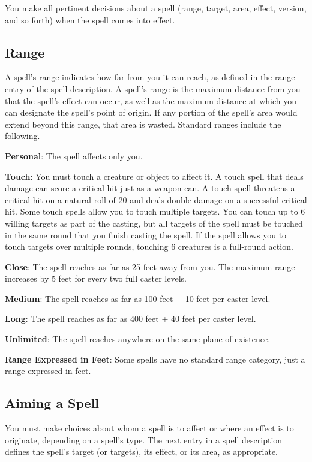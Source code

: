 You make all pertinent decisions about a spell (range, target, area, effect, version, and so forth) when the spell comes into effect.
				
\subsection{Range}

				
A spell's range indicates how far from you it can reach, as defined in the range entry of the spell description. A spell's range is the maximum distance from you that the spell's effect can occur, as well as the maximum distance at which you can designate the spell's point of origin. If any portion of the spell's area would extend beyond this range, that area is wasted. Standard ranges include the following.
				
\textbf{Personal}: The spell affects only you.
				
\textbf{Touch}: You must touch a creature or object to affect it. A touch spell that deals damage can score a critical hit just as a weapon can. A touch spell threatens a critical hit on a natural roll of 20 and deals double damage on a successful critical hit. Some touch spells allow you to touch multiple targets. You can touch up to 6 willing targets as part of the casting, but all targets of the spell must be touched in the same round that you finish casting the spell. If the spell allows you to touch targets over multiple rounds, touching 6 creatures is a full-round action.
				
\textbf{Close}: The spell reaches as far as 25 feet away from you. The maximum range increases by 5 feet for every two full caster levels.
				
\textbf{Medium}: The spell reaches as far as 100 feet + 10 feet per caster level.
				
\textbf{Long}: The spell reaches as far as 400 feet + 40 feet per caster level.
				
\textbf{Unlimited}: The spell reaches anywhere on the same plane of existence.
				
\textbf{Range Expressed in Feet}: Some spells have no standard range category, just a range expressed in feet.
				
\subsection{Aiming a Spell}

				
You must make choices about whom a spell is to affect or where an effect is to originate, depending on a spell's type. The next entry in a spell description defines the spell's target (or targets), its effect, or its area, as appropriate.
				
